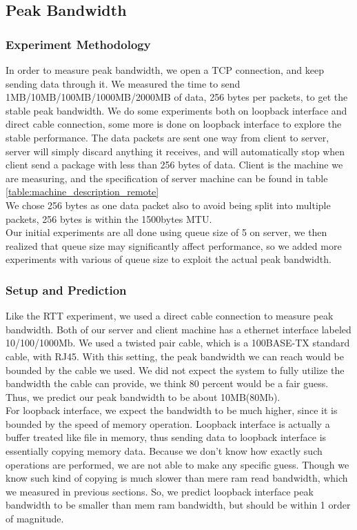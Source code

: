 \documentclass{article} %
\begin{document}
\subsection{Peak Bandwidth}
\subsubsection{Experiment Methodology}
In order to measure peak bandwidth, we open a TCP connection, and keep sending data through it. We measured the time to send 1MB/10MB/100MB/1000MB/2000MB of data, 256 bytes per packets, to get the stable peak bandwidth. We do some experiments both on loopback interface and direct cable connection, some more is done on loopback interface to explore the stable performance. The data packets are sent one way from client to server, server will simply discard anything it receives, and will automatically stop when client send a package with less than 256 bytes of data. Client is the machine we are measuring, and the specification of server machine can be found in table \ref{table:machine_description_remote}\\
We chose 256 bytes as one data packet also to avoid being split into multiple packets, 256 bytes is within the 1500bytes MTU.\\
Our initial experiments are all done using queue size of 5 on server, we then realized that queue size may significantly affect performance, so we added more experiments with various of queue size to exploit the actual peak bandwidth.\\

\subsubsection{Setup and Prediction}
Like the RTT experiment, we used a direct cable connection to measure peak bandwidth. Both of our server and client machine has a ethernet interface labeled 10/100/1000Mb. We used a twisted pair cable, which is a 100BASE-TX standard cable, with RJ45. With this setting, the peak bandwidth we can reach would be bounded by the cable we used. We did not expect the system to fully utilize the bandwidth the cable can provide, we think 80 percent would be a fair guess. Thus, we predict our peak bandwidth to be about 10MB(80Mb).\\ 
For loopback interface, we expect the bandwidth to be much higher, since it is bounded by the speed of memory operation. Loopback interface is actually a buffer treated like file in memory, thus sending data to loopback interface is essentially copying memory data. Because we don't know how exactly such operations are performed, we are not able to make any specific guess. Though we know such kind of copying is much slower than mere ram read bandwidth, which we measured in previous sections. So, we predict loopback interface peak bandwidth to be smaller than mem ram bandwidth, but should be within 1 order of magnitude. \\
\end{document}
